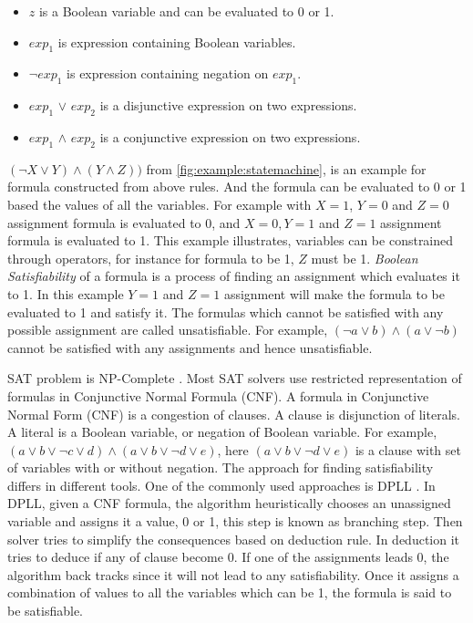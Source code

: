 \begin{itemize}
\item $z$ is a Boolean variable and can be evaluated to 0 or 1.
\item $exp_1$ is expression containing Boolean variables.
\item $\neg exp_1$ is expression containing negation on $exp_1$.
\item $exp_1$ $\vee$ $exp_2$ is a disjunctive expression on two expressions.
\item $exp_1$ $\wedge$ $exp_2$ is a conjunctive expression on two expressions.
\end{itemize}

$(\neg X \vee Y)  \wedge (Y \wedge Z))$ from \autoref{fig:example:statemachine}, is an example for formula constructed from above rules. And the formula can be evaluated to 0 or 1 based the values of all the variables. For example with $X=1$, $Y=0$ and $Z=0$ assignment formula is evaluated to 0, and $X=0, Y=1$ and $Z=1$ assignment formula is evaluated to 1. This example illustrates, variables can be constrained through operators, for instance for formula to be 1, $Z$ must be 1. \emph{Boolean Satisfiability} of a formula is a process of finding an assignment which evaluates it to 1. In this example $Y=1$ and $Z=1$ assignment will make the formula to be evaluated to 1 and satisfy it. The formulas which cannot be satisfied with any possible assignment are called unsatisfiable. For example, $(\neg a \vee b) \wedge (a \vee \neg b)$ cannot be satisfied with any assignments and hence unsatisfiable.

SAT problem is NP-Complete \cite{Malik:2009:BST:1536616.1536637}. Most SAT solvers use restricted representation of formulas in Conjunctive Normal Formula (CNF). A formula in Conjunctive Normal Form (CNF) is a congestion of clauses. A clause is disjunction of literals. A literal is a Boolean variable, or negation of Boolean variable. For example, $(a \vee b \vee \neg c \vee d) \wedge (a \vee b \vee \neg d \vee e)$, here $(a \vee b \vee \neg d \vee e)$ is a clause with set of variables with or without negation. The approach for finding satisfiability differs in different tools. One of the commonly used approaches is DPLL \cite{Davis:1962:MPT:368273.368557}. In DPLL, given a CNF formula, the algorithm heuristically chooses an unassigned variable and assigns it a value, 0 or 1, this step is known as branching step. Then solver tries to simplify the consequences based on deduction rule. In deduction it tries to deduce if any of clause become 0. If one of the assignments leads 0, the algorithm back tracks since it will not lead to any satisfiability. Once it assigns a combination of values to all the variables which can be 1, the formula is said to be satisfiable.

